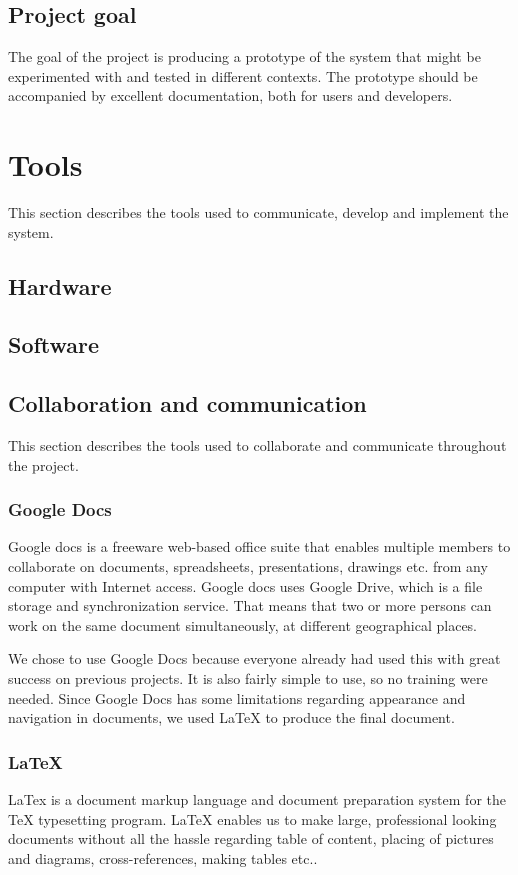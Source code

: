 \documentclass[11pt]{book}
\begin{document}
\subsection{Project goal}
The goal of the project is producing a prototype of the system that might be experimented with and tested in different contexts. The prototype should be accompanied by excellent documentation, both for users and developers.

\section{Tools}
This section describes the tools used to communicate, develop and implement the system.

\subsection{Hardware}

\subsection{Software}

\subsection{Collaboration and communication}
This section describes the tools used to collaborate and communicate throughout the project.

\subsubsection{Google Docs}
Google docs is a freeware web-based office suite that enables multiple members to collaborate on documents, spreadsheets, presentations, drawings etc. from any computer with Internet access. Google docs uses Google Drive, which is a file storage and synchronization service. That means that two or more persons can work on the same document simultaneously, at different geographical places. 

We chose to use Google Docs because everyone already had used this with great success on previous projects. It is also fairly simple to use, so no training were needed. Since Google Docs has some limitations regarding appearance and navigation in documents, we used LaTeX to produce the final document.

\subsubsection{LaTeX}
LaTex is a document markup language and document preparation system for the TeX typesetting program. LaTeX enables us to make large, professional looking documents without all the hassle regarding table of content, placing of pictures and diagrams, cross-references, making tables etc.. 
\end{document}
